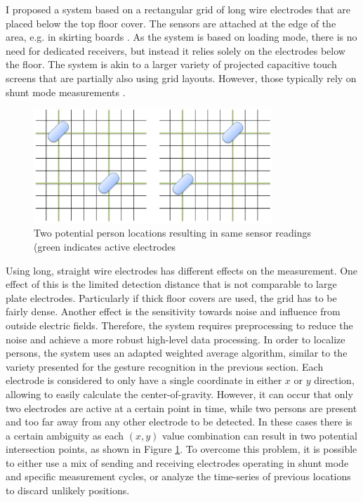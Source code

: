 I proposed a system based on a rectangular grid of long wire electrodes that are placed below the top floor cover. The sensors are attached at the edge of the area, e.g. in skirting boards \cite{Braun2012CapFloor}. As the system is based on loading mode, there is no need for dedicated receivers, but instead it relies solely on the electrodes below the floor. The system is akin to a larger variety of projected capacitive touch screens that are partially also using grid layouts. However, those typically rely on shunt mode measurements \cite{BarrettScreen}. 

\begin{figure}[h]
\centering
\includegraphics[width=0.8\textwidth]{images/capfloor_ghosting}
\caption{Two potential person locations resulting in same sensor readings (green indicates active electrodes}
\label{fig:capfloor_ghosting}
\end{figure}

Using long, straight wire electrodes has different effects on the measurement. One effect of this is the limited detection distance that is not comparable to large plate electrodes. Particularly if thick floor covers are used, the grid has to be fairly dense. Another effect is the sensitivity towards noise and influence from outside electric fields. Therefore, the system requires preprocessing to reduce the noise and achieve a more robust high-level data processing. In order to localize persons, the system uses an adapted weighted average algorithm, similar to the variety presented for the gesture recognition in the previous section. Each electrode is considered to only have a single coordinate in either $x$ or $y$ direction, allowing to easily calculate the center-of-gravity. However, it can occur that only two electrodes are active at a certain point in time, while two persons are present and too far away from any other electrode to be detected. In these cases there is a certain ambiguity as each $(x,y)$ value combination can result in two potential intersection points, as shown in Figure \ref{fig:capfloor_ghosting}. To overcome this problem, it is possible to either use a mix of sending and receiving electrodes operating in shunt mode and specific measurement cycles, or analyze the time-series of previous locations to discard unlikely positions.

